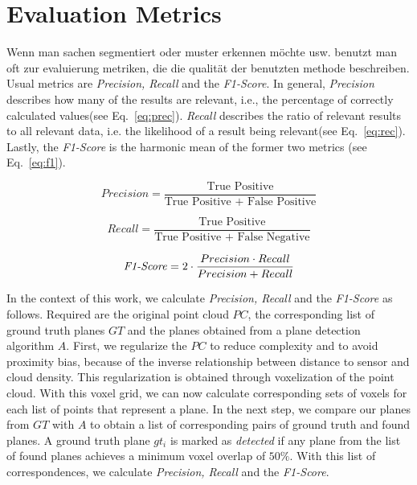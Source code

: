 \documentclass[main.tex]{subfiles}
\begin{document}
\section{Evaluation Metrics}
\label{sec:metrics}
Wenn man sachen segmentiert oder muster erkennen möchte usw. benutzt man oft zur evaluierung metriken, die die qualität der benutzten methode beschreiben.
Usual metrics are \textit{Precision, Recall} and the \textit{F1-Score}.
In general, \textit{Precision} describes how many of the results are relevant, i.e., the percentage of correctly calculated values(see Eq.~\ref{eq:prec}). \textit{Recall} describes the ratio of relevant results to all relevant data, i.e.
the likelihood of a result being relevant(see Eq.~\ref{eq:rec}). Lastly, the \textit{F1-Score} is the harmonic mean of the former two metrics (see Eq.~\ref{eq:f1}).

\begin{equation}
    Precision = \frac{\text{True Positive}}{\text{True Positive + False Positive}}
    \label{eq:prec}
\end{equation}

\begin{equation}
    Recall = \frac{\text{True Positive}}{\text{True Positive + False Negative}}
    \label{eq:rec}
\end{equation}

\begin{equation}
    \text{\textit{F1-Score}} = 2 \cdot\frac{Precision\cdot Recall}{Precision + Recall}
    \label{eq:f1}
\end{equation}



In the context of this work, we calculate \textit{Precision, Recall} and the \textit{F1-Score} as follows.
Required are the original point cloud $PC$, the corresponding list of ground truth planes $GT$ and the planes obtained from a plane detection algorithm $A$.
First, we regularize the $PC$ to reduce complexity and to avoid proximity bias, because of the inverse relationship
between distance to sensor and cloud density. This regularization is obtained through voxelization of the point cloud.
With this voxel grid, we can now calculate corresponding sets of voxels for each list of points that represent a plane.
In the next step, we compare our planes from $GT$ with $A$ to obtain a list of corresponding pairs of ground truth and found planes.
A ground truth plane $gt_i$ is marked as \textit{detected} if any plane from the list of found planes achieves a minimum voxel overlap of $50\%$.
With this list of correspondences, we calculate \textit{Precision, Recall} and the \textit{F1-Score}.
\end{document}
